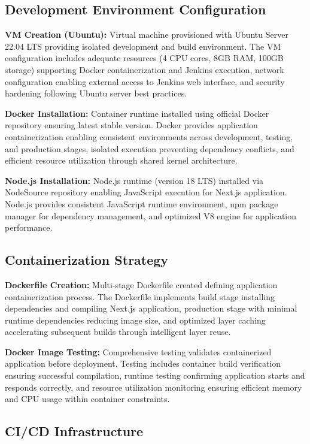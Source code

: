 \subsection{Development Environment Configuration}

\textbf{VM Creation (Ubuntu):} Virtual machine provisioned with Ubuntu Server 22.04 LTS providing isolated development and build environment. The VM configuration includes adequate resources (4 CPU cores, 8GB RAM, 100GB storage) supporting Docker containerization and Jenkins execution, network configuration enabling external access to Jenkins web interface, and security hardening following Ubuntu server best practices.

\textbf{Docker Installation:} Container runtime installed using official Docker repository ensuring latest stable version. Docker provides application containerization enabling consistent environments across development, testing, and production stages, isolated execution preventing dependency conflicts, and efficient resource utilization through shared kernel architecture.

\textbf{Node.js Installation:} Node.js runtime (version 18 LTS) installed via NodeSource repository enabling JavaScript execution for Next.js application. Node.js provides consistent JavaScript runtime environment, npm package manager for dependency management, and optimized V8 engine for application performance.

\subsection{Containerization Strategy}

\textbf{Dockerfile Creation:} Multi-stage Dockerfile created defining application containerization process. The Dockerfile implements build stage installing dependencies and compiling Next.js application, production stage with minimal runtime dependencies reducing image size, and optimized layer caching accelerating subsequent builds through intelligent layer reuse.

\textbf{Docker Image Testing:} Comprehensive testing validates containerized application before deployment. Testing includes container build verification ensuring successful compilation, runtime testing confirming application starts and responds correctly, and resource utilization monitoring ensuring efficient memory and CPU usage within container constraints.

\subsection{CI/CD Infrastructure}


